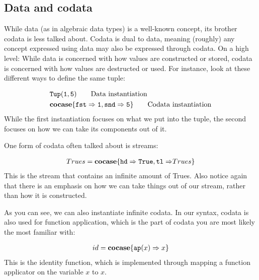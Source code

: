 \documentclass[twoside,12pt,a4paper]{article}
\begin{document}
\subsection{Data and codata}
While data (as in algebraic data types) is a well-known concept, 
its brother codata is less talked about. Codata is dual to data, meaning (roughly) any concept expressed using data may also be expressed through codata. 
On a high level: While data is concerned with how values are constructed or stored, codata is concerned with how values are destructed or used. 
For instance, look at these different ways to define the same tuple: 

\begin{example}
    \begin{align*}
        &\mathtt{Tup(}\mathtt{1,5}\mathtt{)} \tag*{Data instantiation}\\
        &\textbf{cocase}\{\mathtt{fst \Rightarrow 1}, \mathtt{snd \Rightarrow 5}\} \tag*{Codata instantiation}
    \end{align*}     
    While the first instantiation focuses on what we put into the tuple, the second focuses on how we can take its components out of it.   
\end{example}

One form of codata often talked about is streams:
\begin{example}[Streams]
    \begin{align*}
        Trues = \textbf{cocase}\{\mathtt{hd \Rightarrow True, tl \Rightarrow} Trues\}
    \end{align*}
    This is the stream that contains an infinite amount of Trues.
    Also notice again that there is an emphasis on how we can take things out of our stream, rather than how it is constructed.
\end{example}
As you can see, we can also instantiate infinite codata. 
In our syntax, codata is also used for function application, 
which is the part of codata you are most likely the most familiar with:

\begin{example}
    \begin{align*}
        id = \textbf{cocase}\{\texttt{ap}(x)\Rightarrow x\}
    \end{align*}
    This is the identity function, which is implemented through mapping a
    function applicator on the variable $x$ to $x$.
\end{example}
    
\end{document}
